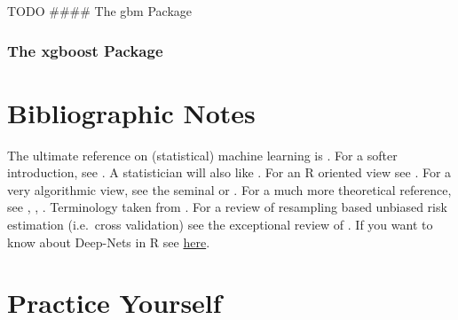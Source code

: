 \documentclass[]{book}
\theoremstyle{definition}
\theoremstyle{definition}
\theoremstyle{definition}
\theoremstyle{remark}
\begin{document}
TODO \#\#\#\# The gbm Package

\subsubsection{The xgboost Package}\label{the-xgboost-package}

\section{Bibliographic Notes}\label{bibliographic-notes-6}

The ultimate reference on (statistical) machine learning is
\citet{friedman2001elements}. For a softer introduction, see
\citet{james2013introduction}. A statistician will also like
\citet{ripley2007pattern}. For an R oriented view see
\citet{lantz2013machine}. For a very algorithmic view, see the seminal
\citet{leskovec2014mining} or \citet{conway2012machine}. For a much more
theoretical reference, see \citet{mohri2012foundations},
\citet{vapnik2013nature}, \citet{shalev2014understanding}. Terminology
taken from \citet{sammut2011encyclopedia}. For a review of resampling
based unbiased risk estimation (i.e.~cross validation) see the
exceptional review of \citet{arlot2010survey}. If you want to know about
Deep-Nets in R see
\href{https://www.datacamp.com/community/tutorials/keras-r-deep-learning}{here}.

\section{Practice Yourself}\label{practice-yourself-6}
\end{document}
